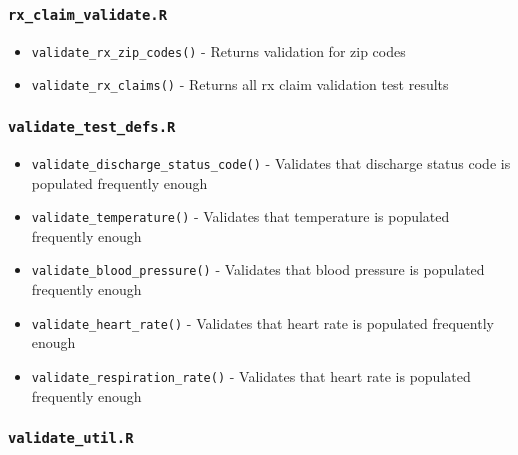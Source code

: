 \documentclass[
]{book}
\providecommand{\tightlist}{%
  \setlength{\itemsep}{0pt}\setlength{\parskip}{0pt}}
\begin{document}
\hypertarget{rx_claim_validate.r}{%
\subsubsection{\texorpdfstring{\texttt{rx\_claim\_validate.R}}{rx\_claim\_validate.R}}\label{rx_claim_validate.r}}

\begin{itemize}
\tightlist
\item
  \texttt{validate\_rx\_zip\_codes()} - Returns validation for zip codes
\item
  \texttt{validate\_rx\_claims()} - Returns all rx claim validation test results
\end{itemize}

\hypertarget{validate_test_defs.r}{%
\subsubsection{\texorpdfstring{\texttt{validate\_test\_defs.R}}{validate\_test\_defs.R}}\label{validate_test_defs.r}}

\begin{itemize}
\tightlist
\item
  \texttt{validate\_discharge\_status\_code()} - Validates that discharge status code is populated frequently enough
\item
  \texttt{validate\_temperature()} - Validates that temperature is populated frequently enough
\item
  \texttt{validate\_blood\_pressure()} - Validates that blood pressure is populated frequently enough
\item
  \texttt{validate\_heart\_rate()} - Validates that heart rate is populated frequently enough
\item
  \texttt{validate\_respiration\_rate()} - Validates that heart rate is populated frequently enough
\end{itemize}

\hypertarget{validate_util.r}{%
\subsubsection{\texorpdfstring{\texttt{validate\_util.R}}{validate\_util.R}}\label{validate_util.r}}
\end{document}
